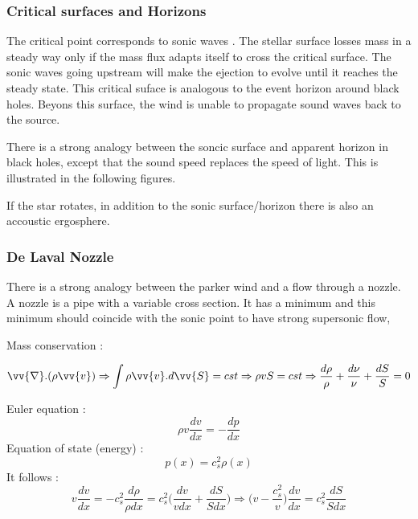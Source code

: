 \documentclass[10pt,a4paper,english,draft]{article}
\begin{document}
\subsubsection{Critical surfaces and Horizons}

The critical point corresponds to sonic waves . The stellar surface losses mass in a steady
way only if the mass flux  adapts itself to cross the critical surface. The sonic waves going
upstream will make the ejection to evolve until it reaches the steady state. This critical suface
is analogous to the event horizon around black holes. Beyons this surface, the wind is unable
to propagate sound waves back to the source.

There is a strong analogy between the soncic surface and apparent horizon in black holes, 
except that the sound speed  replaces the speed of light. This is illustrated in the following
figures. 


If the star rotates, in addition to the sonic surface/horizon there is also an accoustic ergosphere.

  
\subsubsection{De Laval Nozzle}

There is a strong analogy between the parker wind and a flow through a nozzle. A nozzle is a 
pipe with a variable cross section. It has a minimum and this minimum should coincide with the
sonic point to have strong supersonic flow,


Mass conservation : 

\begin{equation}
\vv{\nabla}.(\rho\vv{v}) \Rightarrow \int \rho\vv{v}.d\vv{S} = cst \Rightarrow \rho vS = cst 
\Rightarrow \frac{d\rho}{\rho} + \frac{d\nu}{\nu} + \frac{dS}{S} = 0
\end{equation}

Euler equation : \begin{equation} 
\rho v \frac{dv}{dx} = -\frac{dp}{dx} 
\end{equation}
Equation of state (energy) :
\begin{equation}
p(x) = c_{s}^2\rho(x)
\end{equation}  
 It follows : 
\begin{equation}
v\frac{dv}{dx} = -c_s^2\frac{d\rho}{\rho dx} = c_s^2\bigg(\frac{dv}{vdx}+\frac{dS}{Sdx}\bigg)
\Rightarrow \bigg( v - \frac{c_s^2}{v} \bigg)\frac{dv}{dx} = c_s^2\frac{dS}{Sdx}
\end{equation}
  
\end{document}
